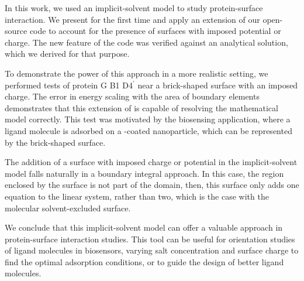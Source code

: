 
In this work, we used an implicit-solvent model to study protein-surface interaction. We present for the first time and apply an extension of our open-source \pygbe code to account for the presence of surfaces with imposed potential or charge. The new feature of the code was verified against an analytical solution, which we derived for that purpose. 

To demonstrate the power of this approach in a more realistic setting, we performed tests of protein G B1 D4$^\prime$ near a brick-shaped surface with an imposed charge. The error in energy scaling with the area of boundary elements demonstrates that this extension of \pygbe is capable of resolving the mathematical model correctly. This test was motivated by the biosensing application, where a ligand molecule is adsorbed on a \sam-coated nanoparticle, which can be represented by the brick-shaped surface.

The addition of a surface with imposed charge or potential in the implicit-solvent model falls naturally in a boundary integral approach. In this case, the region enclosed by the surface is not part of the domain, then, this surface only adds one equation to the linear system, rather than two, which is the case with the molecular solvent-excluded surface.

We conclude that this implicit-solvent model can offer a valuable approach in protein-surface interaction studies. This tool can be useful for orientation studies of ligand molecules in biosensors, varying salt concentration and surface charge to find the optimal adsorption conditions, or to guide the design of better ligand molecules. 
